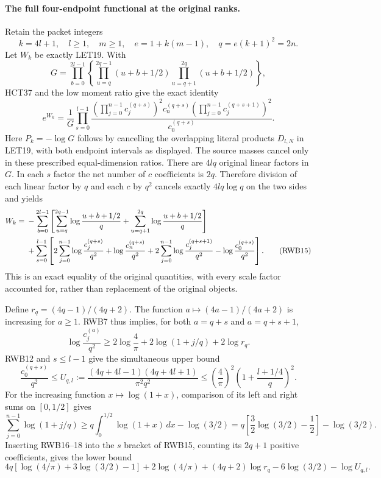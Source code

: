 \paragraph{The full four-endpoint functional at the original ranks.}
Retain the packet integers
\[
 k=4l+1,\quad l\ge1,\quad m\ge1,\quad
 e=1+k(m-1),\quad q=e(k+1)^2=2n.
 \tag{RWB13}
\]
Let $W_k$ be exactly LET19. With
\[
 G=\prod_{b=0}^{2l-1}
 \left\{\prod_{u=q}^{2q-1}(u+b+1/2)
         \prod_{u=q+1}^{2q}(u+b+1/2)\right\},
\]
HCT37 and the low moment ratio give the exact identity
\[
 e^{W_k}=\frac1G\prod_{s=0}^{l-1}
 \frac{\displaystyle
       \left(\prod_{j=0}^{n-1}c_j^{(q+s)}\right)^2
       c_n^{(q+s)}
       \left(\prod_{j=0}^{n-1}c_j^{(q+s+1)}\right)^2}
      {c_0^{(q+s)}}.
 \tag{RWB14}
\]
Here $P_k=-\log G$ follows by cancelling the overlapping literal
products $D_{l,N}$ in LET19, with both endpoint intervals as displayed.
The source masses cancel only in these prescribed equal-dimension
ratios. There are $4lq$ original linear factors in $G$. In each $s$
factor the net number of $c$ coefficients is $2q$. Therefore division
of each linear factor by $q$ and each $c$ by $q^2$ cancels exactly
$4lq\log q$ on the two sides and yields
\begin{align}
 W_k={}&-\sum_{b=0}^{2l-1}
 \left[\sum_{u=q}^{2q-1}\log\frac{u+b+1/2}{q}
       +\sum_{u=q+1}^{2q}\log\frac{u+b+1/2}{q}\right]\notag\\
 &+\sum_{s=0}^{l-1}\left[
 2\sum_{j=0}^{n-1}\log\frac{c_j^{(q+s)}}{q^2}
 +\log\frac{c_n^{(q+s)}}{q^2}
 +2\sum_{j=0}^{n-1}\log\frac{c_j^{(q+s+1)}}{q^2}
 -\log\frac{c_0^{(q+s)}}{q^2}\right].
 \tag{RWB15}
\end{align}
This is an exact equality of the original quantities, with every scale
factor accounted for, rather than replacement of the original objects.

Define $r_q=(4q-1)/(4q+2)$. The function
$a\mapsto(4a-1)/(4a+2)$ is increasing for $a\ge1$. RWB7 thus implies,
for both $a=q+s$ and $a=q+s+1$,
\[
 \log\frac{c_j^{(a)}}{q^2}
 \ge2\log\frac4\pi+2\log(1+j/q)+2\log r_q.
 \tag{RWB16}
\]
RWB12 and $s\le l-1$ give the simultaneous upper bound
\[
 \frac{c_0^{(q+s)}}{q^2}\le
 U_{q,l}:=\frac{(4q+4l-1)(4q+4l+1)}{\pi^2q^2}
 \le\left(\frac4\pi\right)^2
          \left(1+\frac{l+1/4}{q}\right)^2.
 \tag{RWB17}
\]
For the increasing function $x\mapsto\log(1+x)$, comparison of its
left and right sums on $[0,1/2]$ gives
\[
 \sum_{j=0}^{n-1}\log(1+j/q)
 \ge q\int_0^{1/2}\log(1+x)\,dx-\log(3/2)
 =q\left[\frac32\log(3/2)-\frac12\right]-\log(3/2).
 \tag{RWB18}
\]
Inserting RWB16--18 into the $s$ bracket of RWB15, counting its
$2q+1$ positive coefficients, gives the lower bound
\[
 4q\left[\log(4/\pi)+3\log(3/2)-1\right]
 +2\log(4/\pi)+(4q+2)\log r_q
 -6\log(3/2)-\log U_{q,l}.
 \tag{RWB19}
\]

